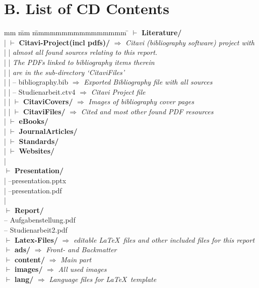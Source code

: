 \section*{B. List of CD Contents}
\begin{tabbing}
	mm \= mm \= mmmmmmmmmmmmmmmm \= \kill
	$\vdash$ \textbf{Literature/} \\ 
	| \> $\vdash$ \textbf{Citavi-Project(incl pdfs)/} \> \> $\Rightarrow$ \textit{Citavi (bibliography software) project with}\\
	| \> | \> \> \textit{almost all found sources relating to this report.} \\
	| \> | \> \> \textit{The PDFs linked to bibliography items therein} \\
	| \> | \> \> \textit{are in the sub-directory `CitaviFiles'}\\
	| \> | \>  -- bibliography.bib  \> $\Rightarrow$ \textit{Exported Bibliography file with all sources}\\
	| \> | \>  --	Studienarbeit.ctv4  \>  $\Rightarrow$ \textit{Citavi Project file}\\
	| \> | \>  $\vdash$ \textbf{CitaviCovers/} \>  $\Rightarrow$ \textit{Images of bibliography cover pages}\\
	| \> | \>  $\vdash$ \textbf{CitaviFiles/} \> $\Rightarrow$ \textit{Cited and most other found PDF resources}\\ %
	| \> $\vdash$ \textbf{eBooks/} \\
	| \> $\vdash$ \textbf{JournalArticles/} \\
	| \> $\vdash$ \textbf{Standards/}\\
	| \> $\vdash$ \textbf{Websites/} \\ %
	|\\
	$\vdash$ \textbf{Presentation/} \\
	| \>  --presentation.pptx\\
	| \>  --presentation.pdf\\
	|\\
	$\vdash$ \textbf{Report/} \\ %
	\>  -- Aufgabenstellung.pdf\\
	\>  -- Studienarbeit2.pdf\\
	\>  $\vdash$ \textbf{Latex-Files/}   $\Rightarrow$ \textit{editable \LaTeX~files and other included files for this report}\\ %
	\> \>  $\vdash$  \textbf{ads/}   	\> $\Rightarrow$ \textit{Front- and Backmatter}\\
	\> \>  $\vdash$  \textbf{content/}  \> $\Rightarrow$ \textit{Main part}\\
	\> \>  $\vdash$  \textbf{images/}   \> $\Rightarrow$ \textit{All used images}\\
	\> \>  $\vdash$  \textbf{lang/}  \> $\Rightarrow$ \textit{Language files for \LaTeX~template}\\ %
\end{tabbing}
